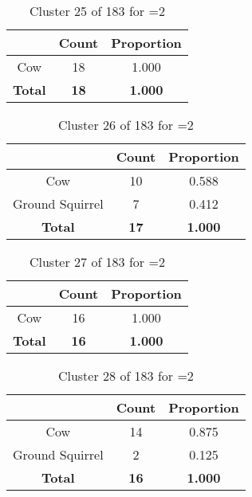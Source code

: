 \begin{table}[ht!]
\centering
\begin{tabular}{|c|c|c|}
\hline
\bf \Spec{} &\bf Count &\bf Proportion\\ \hline \hline
Cow & 18 & 1.000\\ \hline
\hline
\bf Total & \bf 18 & \bf 1.000\\ \hline
\end{tabular}
\label{tab:cluster:25:2}
\caption{Cluster 25 of 183 for \minneigh{}=2}
\end{table}

\begin{table}[ht!]
\centering
\begin{tabular}{|c|c|c|}
\hline
\bf \Spec{} &\bf Count &\bf Proportion\\ \hline \hline
Cow & 10 & 0.588\\ \hline
Ground Squirrel & 7 & 0.412\\ \hline
\hline
\bf Total & \bf 17 & \bf 1.000\\ \hline
\end{tabular}
\label{tab:cluster:26:2}
\caption{Cluster 26 of 183 for \minneigh{}=2}
\end{table}

\begin{table}[ht!]
\centering
\begin{tabular}{|c|c|c|}
\hline
\bf \Spec{} &\bf Count &\bf Proportion\\ \hline \hline
Cow & 16 & 1.000\\ \hline
\hline
\bf Total & \bf 16 & \bf 1.000\\ \hline
\end{tabular}
\label{tab:cluster:27:2}
\caption{Cluster 27 of 183 for \minneigh{}=2}
\end{table}

\begin{table}[ht!]
\centering
\begin{tabular}{|c|c|c|}
\hline
\bf \Spec{} &\bf Count &\bf Proportion\\ \hline \hline
Cow & 14 & 0.875\\ \hline
Ground Squirrel & 2 & 0.125\\ \hline
\hline
\bf Total & \bf 16 & \bf 1.000\\ \hline
\end{tabular}
\label{tab:cluster:28:2}
\caption{Cluster 28 of 183 for \minneigh{}=2}
\end{table}


